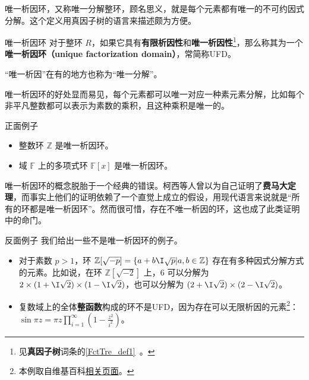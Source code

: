 


唯一析因环，又称唯一分解整环，顾名思义，就是每个元素都有唯一的不可约因式分解。这个定义用真因子树的语言来描述颇为方便。

\begin{definition}{唯一析因环}
对于整环 $R$，如果它具有\textbf{有限析因性}和\textbf{唯一析因性}\footnote{见\textbf{真因子树}词条的\autoref{FctTre_def1}~。}，那么称其为一个\textbf{唯一析因环（unique factorization domain）}，常简称UFD。
\end{definition}

“唯一析因”在有的地方也称为“唯一分解”。

唯一析因环的好处显而易见，每个元素都可以唯一对应一种素元素分解，比如每个非平凡整数都可以表示为素数的乘积，且这种乘积是唯一的。

\begin{example}{正面例子}
\begin{itemize}
\item 整数环 $\mathbb{Z}$ 是唯一析因环。
\item 域 $\mathbb{F}$ 上的多项式环 $\mathbb{F}[x]$ 是唯一析因环。
\end{itemize}
\end{example}

唯一析因环的概念脱胎于一个经典的错误。柯西等人曾以为自己证明了\textbf{费马大定理}，而事实上他们的证明依赖了一个直觉上成立的假设，用现代语言来说就是“所有的环都是唯一析因环”。然而很可惜，存在不唯一析因的环，这也成了此类证明中的命门。

\begin{example}{反面例子}
我们给出一些不是唯一析因环的例子。
\begin{itemize}
\item 对于素数 $p>1$，环 $\mathbb{Z}[\sqrt{-p}]=\{a+b\I\sqrt{p}|a, b\in\mathbb{Z}\}$ 存在有多种因式分解方式的元素。比如说，在环 $\mathbb{Z}[\sqrt{-2}]$ 上，$6$ 可以分解为 $2\times (1+\I\sqrt{2})\times(1-\I\sqrt{2})$，也可以分解为 $(2+\I\sqrt{2})\times(2-\I\sqrt{2})$。
\item 复数域上的全体\textbf{整函数}构成的环不是UFD，因为存在可以无限析因的元素\footnote{本例取自维基百科\href{https://en.wikipedia.org/wiki/Unique_factorization_domain}{相关页面}。}：$\sin{\pi z=\pi z\prod\limits_{i=1}^\infty(1-\frac{z^2}{i^2})}$。
\end{itemize}
\end{example}

